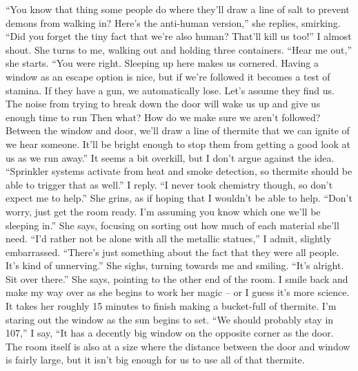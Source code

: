 \documentclass[a4paper, 12pt]{book}
\newcommand\tab[1][1cm]{\hspace*{#1}}
\begin{document}
\tab
``You know that thing some people do where they’ll draw a line of salt to prevent demons from walking in? Here’s the anti-human version,'' she replies, smirking.
\newline
\tab
``Did you forget the tiny fact that we’re also human? That’ll kill us too!'' I almost shout. 
\newline
\tab
She turns to me, walking out and holding three containers. ``Hear me out,'' she starts. ``You were right. Sleeping up here makes us cornered. Having a window as an escape option is nice, but if we’re followed it becomes a test of stamina. If they have a gun, we automatically lose. Let’s assume they find us. The noise from trying to break down the door will wake us up and give us enough time to run Then what? How do we make sure we aren’t followed? Between the window and door, we’ll draw a line of thermite that we can ignite of we hear someone. It’ll be bright enough to stop them from getting a good look at us as we run away.'' It seems a bit overkill, but I don’t argue against the idea.
\newline
\tab
``Sprinkler systems activate from heat and smoke detection, so thermite should be able to trigger that as well.'' I reply. ``I never took chemistry though, so don’t expect me to help.''
\newline
\tab
She grins, as if hoping that I wouldn’t be able to help. ``Don’t worry, just get the room ready. I’m assuming you know which one we’ll be sleeping in.'' She says, focusing on sorting out how much of each material she’ll need.
\newline
\tab
``I’d rather not be alone with all the metallic statues,'' I admit, slightly embarrassed. ``There’s just something about the fact that they were all people. It’s kind of unnerving.''
\newline
\tab
She sighs, turning towards me and smiling. ``It’s alright. Sit over there.'' She says, pointing to the other end of the room. I smile back and make my way over as she begins to work her magic -- or I guess it’s more science. It takes her roughly 15 minutes to finish making a bucket-full of thermite. 
\newline
\tab
I’m staring out the window as the sun begins to set. ``We should probably stay in 107,'' I say, ``It has a decently big window on the opposite corner as the door. The room itself is also at a size where the distance between the door and window is fairly large, but it isn’t big enough for us to use all of that thermite.
\newline
\end{document}
